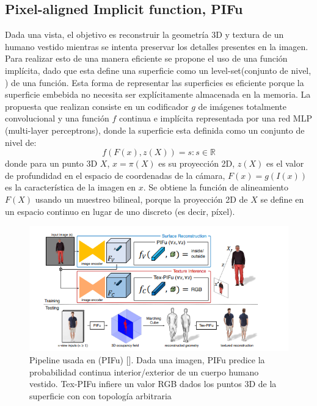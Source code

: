 \subsection{Pixel-aligned Implicit function, PIFu}

Dada una vista, el objetivo es reconstruir la geometría 3D y textura de un humano vestido mientras se intenta preservar los detalles presentes en la imagen. Para realizar esto de una manera eficiente se propone el uso de una función implícita, dado que esta define una superficie como un level-set(conjunto de nivel,  ) de una función. Esta forma de representar las superficies es eficiente porque la superficie embebida no necesita ser explícitamente almacenada en la memoria. La propuesta que realizan consiste en un codificador $g$ de imágenes totalmente convolucional y una función $f$ continua e implícita representada por una red MLP (multi-layer perceptrons), donde la superficie esta definida como un conjunto de nivel de:
\begin{equation}
	f(F(x), z(X)) = s : s \in \mathbb{R}
\end{equation}
donde para un punto 3D $X$, $x = \pi(X)$ es su proyección 2D, $z(X)$ es el valor de profundidad en el espacio de coordenadas de la cámara, $F(x) = g(I(x))$ es la característica de la imagen en $x$. Se obtiene la función de alineamiento $F(X)$ usando un muestreo bilineal, porque la proyección 2D de $X$ se define en un espacio continuo en lugar de uno discreto (es decir, píxel).

\begin{figure}[H]
	\centering
	\includegraphics[scale=0.7]{imagenes/antecedentes2.png}
	\caption{Pipeline usada en (PIFu) [\cite{pifu}]. Dada una imagen, PIFu predice la probabilidad continua interior/exterior de un cuerpo humano vestido. Tex-PIFu infiere un valor RGB dados los puntos 3D de la superficie con  con topología arbitraria}
	\label{fig:figura8}
\end{figure}

